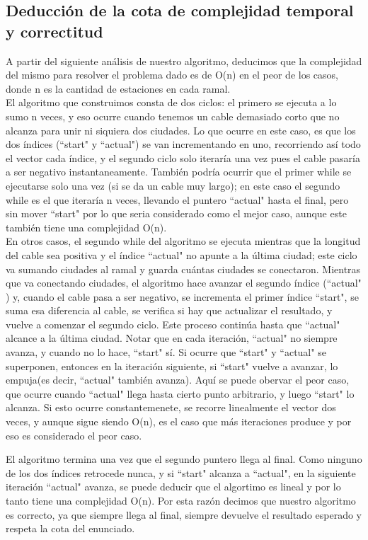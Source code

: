 \subsection{Deducción de la cota de complejidad temporal y correctitud}

A partir del siguiente análisis de nuestro algoritmo, deducimos que la complejidad del mismo para resolver el problema dado es de O(n) en el peor de los casos, donde n es la cantidad de estaciones en cada ramal. \\
El algoritmo que construimos consta de dos ciclos: el primero se ejecuta a lo sumo n veces, y eso ocurre cuando tenemos un cable demasiado corto que no alcanza para unir ni siquiera dos ciudades. Lo que ocurre en este caso, es que los dos índices (``start"$ $ y ``actual"$ $) se van incrementando en uno, recorriendo así todo el vector cada índice, y el segundo ciclo solo iteraría una vez pues el cable pasaría a ser negativo instantaneamente. También podría ocurrir que el primer while se ejecutarse solo una vez (si se da un cable muy largo); en este caso el segundo while es el que iteraría n veces, llevando el puntero ``actual"$ $ hasta el final, pero sin mover ``start"$ $ por lo que seria considerado como el mejor caso, aunque este también tiene una complejidad O(n).\\
En otros casos, el segundo while del algoritmo se ejecuta mientras que la longitud del cable sea positiva y el índice ``actual"$ $ no apunte a la última ciudad; este ciclo va sumando ciudades al ramal y guarda cuántas ciudades se conectaron. Mientras que va conectando ciudades, el algoritmo hace avanzar el segundo índice (``actual"$ $) y, cuando el cable pasa a ser negativo, se incrementa el primer índice ``start"$ $, se suma esa diferencia al cable, se verifica si hay que actualizar el resultado, y vuelve a comenzar el segundo ciclo. Este proceso continúa hasta que ``actual"$ $ alcance a la última ciudad. Notar que en cada iteración, ``actual"$ $ no siempre avanza, y cuando no lo hace, ``start"$ $ sí. Si ocurre que ``start"$ $ y ``actual"$ $ se superponen, entonces en la iteración siguiente, si ``start"$ $ vuelve a avanzar, lo empuja(es decir, ``actual"$ $ también avanza). Aquí se puede obervar el peor caso, que ocurre cuando ``actual"$ $ llega hasta cierto punto arbitrario, y luego ``start"$ $ lo alcanza. Si esto ocurre constantemenete, se recorre linealmente el vector dos veces, y aunque sigue siendo O(n), es el caso que más iteraciones produce y por eso es considerado el peor caso.

El algoritmo termina una vez que el segundo puntero llega al final. Como ninguno de los dos índices retrocede nunca, y si ``start"$ $ alcanza a ``actual"$ $, en la siguiente iteración ``actual"$ $ avanza,  se puede deducir que el algortimo es lineal y por lo tanto tiene una complejidad O(n). Por esta razón decimos que nuestro algoritmo es correcto, ya que siempre llega al final, siempre devuelve el resultado esperado y respeta la cota del enunciado.

